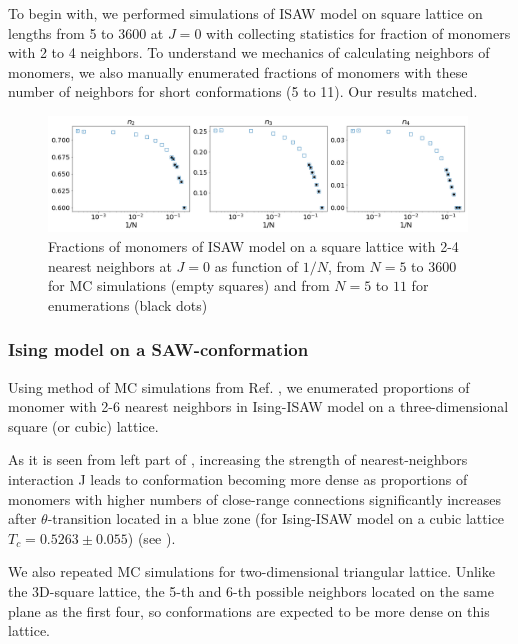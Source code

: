 \documentclass[a4paper]{jpconf}
\begin{document}
To begin with, we performed simulations of ISAW model on square lattice on lengths from 5 to 3600 at $J=0$ with collecting statistics for fraction of monomers with 2 to 4 neighbors. To understand we mechanics of calculating neighbors of monomers, we also manually enumerated fractions of monomers with these number of neighbors for short conformations (5 to 11). Our results matched.

\begin{figure}[h!]
    \centering
    \includegraphics[width=0.99\textwidth]{Images/ISAWJ0_Bulk2-4.png}
    \caption{Fractions of monomers of ISAW model on a square lattice with 2-4 nearest neighbors at $J=0$ as function of $1/N$, from $N = 5$ to $3600$ for MC simulations (empty squares) and from $N = 5$ to $11$ for enumerations (black dots)}
    \label{fig:Ising_vs_ISAW}
\end{figure}

\subsubsection{Ising model on a SAW-conformation}

Using method of MC simulations from Ref. \cite{faizullina2021critical}, we enumerated proportions of monomer with 2-6 nearest neighbors in Ising-ISAW model on a three-dimensional square (or cubic) lattice.

As it is seen from left part of , increasing the strength of nearest-neighbors interaction J leads to conformation becoming more dense as proportions of monomers with higher numbers of close-range connections significantly increases after $\theta$-transition located in a blue zone (for Ising-ISAW model on a cubic lattice $T_{c} = 0.5263 \pm 0.055$\cite{Foster2021}) (see ).

We also repeated MC simulations for two-dimensional triangular lattice. Unlike the 3D-square lattice, the 5-th and 6-th possible neighbors located on the same plane as the first four, so conformations are expected to be more dense on this lattice.

\end{document}

